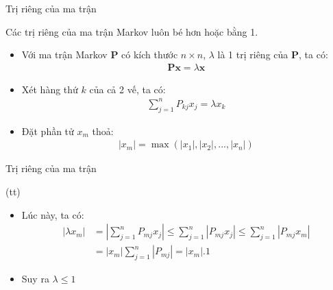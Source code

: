 \begin{frame}{Trị riêng của ma trận}
    \begin{mytheo*}{}
        Các trị riêng của ma trận Markov luôn bé hơn hoặc bằng 1.
    \end{mytheo*}
    \begin{myproof*}{}
    \begin{itemize}
        \item[\bullet] Với ma trận Markov $\mathbf{P}$ có kích thước $n \times n$, $\lambda$ là 1 trị riêng của $\mathbf{P}$, ta có: 
        \begin{align*}
            \mathbf{P}\textbf{x} = \lambda \textbf{x}
        \end{align*}
    
        \item[\bullet]Xét hàng thứ $k$ của cả 2 vế, ta có:
        \begin{align*}
            \sum_{j = 1}^n P_{kj}x_j = \lambda x_k
        \end{align*}
    
        \item[\bullet] Đặt phần tử $x_m$ thoả:
        \begin{align*}
            |x_m| = \max (|x_1|, |x_2|, ... ,|x_n|)
        \end{align*}
    \end{itemize}
\end{myproof*}
\end{frame}

\begin{frame}{Trị riêng của ma trận}
    \begin{myproof*}{(tt)}
    \begin{itemize}
        \item[\bullet] Lúc này, ta có:
        \begin{align*}
        |\lambda x_m| &= \left|\sum_{j = 1}^n P_{mj}x_j\right|
        \leq \sum_{j = 1}^n |P_{mj}x_j|           
        \leq \sum_{j = 1}^n |P_{mj}x_m| \\         
        &= |x_m|\sum_{j = 1}^n |P_{mj}|         
        = |x_m|.1
        \end{align*}
        
        \item[\bullet] Suy ra $\lambda \leq 1$
    \end{itemize}
\end{myproof*}
\end{frame}